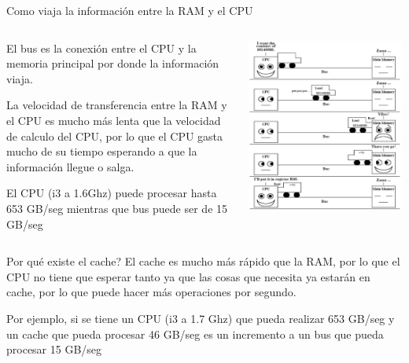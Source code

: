 \documentclass[11pt]{beamer}
\begin{document}
		\begin{frame}{Como viaja la información entre la RAM y el CPU}
			\begin{columns}	
				\begin{column}{0.5\textwidth}
					El bus es la conexión entre el CPU y la memoria principal por donde la información viaja.
					
					La velocidad de transferencia entre la RAM y el CPU es mucho más lenta que la velocidad de calculo del CPU, por lo que el CPU gasta mucho de su tiempo esperando a que la información llegue o salga.
					
					El CPU (i3 a 1.6Ghz) puede procesar hasta 653 GB/seg mientras que bus puede ser de 15 GB/seg	
				\end{column}
				\begin{column}{0.5\textwidth}	
					\includegraphics[width=\textwidth]{bus.jpg}
				\end{column}
			\end{columns}
		\end{frame}
		\begin{frame}{Por qué existe el cache?}
			El cache es mucho más rápido que la RAM, por lo que el CPU no tiene que esperar tanto ya que las cosas que necesita ya estarán en cache, por lo que puede hacer más operaciones por segundo.
			
			Por ejemplo, si se tiene un CPU (i3 a 1.7 Ghz) que pueda realizar 653 GB/seg y un cache que pueda procesar 46 GB/seg es un incremento a un bus que pueda procesar 15 GB/seg
		\end{frame}
\end{document}
